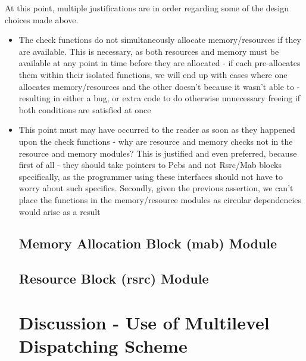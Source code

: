 \documentclass[11pt]{article}
\begin{document}
At this point, multiple justifications are in order regarding some of the design choices made above. 
\begin{itemize}
\item The check functions do not simultaneously allocate memory/resources if they are available. This is necessary, as both resources and memory must be available at any point in time before they are allocated - if each pre-allocates them within their isolated functions, we will end up with cases where one allocates memory/resources and the other doesn't because it wasn't able to - resulting in either a bug, or extra code to do otherwise unnecessary freeing if both conditions are satisfied at once
\item This point must may have occurred to the reader as soon as they happened upon the check functions - why are resource and memory checks not in the resource and memory modules? This is justified and even preferred, because first of all - they should take pointers to Pcbs and not Rsrc/Mab blocks specifically, as the programmer using these interfaces should not have to worry about such specifics. Secondly, given the previous assertion, we can't place the functions in the memory/resource modules as circular dependencies would arise as a result

\subsection{Memory Allocation Block (mab) Module}


\subsection{Resource Block (rsrc) Module}



\pagebreak
\section{Discussion - Use of Multilevel Dispatching Scheme}


\end{itemize}
\end{document}
